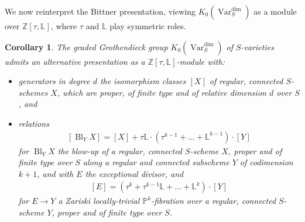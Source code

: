 \documentclass{amsart}
\newtheorem{cor}[thm]{Corollary}
\theoremstyle{definition}
\DeclareMathOperator{\Var}{Var}
\DeclareMathOperator{\Bl}{Bl}
\newcommand{\KdimS}{K_0(\Var_S^{\dim})}
\numberwithin{equation}{section}
\begin{document}
We now reinterpret the Bittner presentation, viewing $\KdimS$ as a module over $\mathbb{Z}[\tau, \mathbb{L}]$, where $\tau$ and $\mathbb{L}$ play symmetric roles.

\begin{cor}\label{bit module}
The graded Grothendieck group $\KdimS$ of $S$-varieties admits an alternative presentation as a $\mathbb{Z}[\tau, \mathbb{L}]$-module with:

\begin{itemize}
    \item generators in degree $d$ the isomorphism classes $[X]$ of regular, connected $S$-schemes $X$, which are proper, of finite type and of relative dimension $d$ over $S$, and
    \item relations
        \begin{align}\tag{1}
            [\Bl_Y X] = [X] + \tau \mathbb{L} \cdot (\tau^{k-1} + \ldots + \mathbb{L}^{k-1}) \cdot [Y]
        \end{align}
        for $\Bl_Y X$ the blow-up of a regular, connected $S$-scheme $X$, proper and of finite type over $S$ along a regular and connected subscheme $Y$ of codimension $k+1$, and with $E$ the exceptional divisor, and 
        \begin{align}\tag{2}
            [E] = (\tau^{k}+ \tau^{k-1} \mathbb{L} +  \ldots + \mathbb{L}^{k}) \cdot [Y]
        \end{align} 
        for $E \rightarrow Y$ a Zariski locally-trivial $\mathbb{P}^k$-fibration over a regular, connected $S$-scheme $Y$, proper and of finite type over $S$.
        
\end{itemize}
\end{cor}
\end{document}
